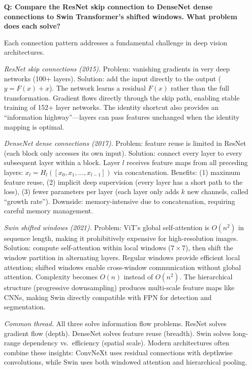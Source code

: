 \begin{interviewq}
\textbf{Q: Compare the ResNet skip connection to DenseNet dense connections to Swin Transformer's shifted windows. What problem does each solve?}

 \quad {} \quad \badgefreq{\freqmed}

\stronganswer Each connection pattern addresses a fundamental challenge in deep vision architectures.

\textit{ResNet skip connections (2015).} Problem: vanishing gradients in very deep networks (100+ layers). Solution: add the input directly to the output ($y = F(x) + x$). The network learns a residual $F(x)$ rather than the full transformation. Gradient flows directly through the skip path, enabling stable training of 152+ layer networks. The identity shortcut also provides an ``information highway''---layers can pass features unchanged when the identity mapping is optimal.

\textit{DenseNet dense connections (2017).} Problem: feature reuse is limited in ResNet (each block only accesses its own input). Solution: connect every layer to every subsequent layer within a block. Layer $l$ receives feature maps from all preceding layers: $x_l = H_l([x_0, x_1, \ldots, x_{l-1}])$ via concatenation. Benefits: (1) maximum feature reuse, (2) implicit deep supervision (every layer has a short path to the loss), (3) fewer parameters per layer (each layer only adds $k$ new channels, called ``growth rate''). Downside: memory-intensive due to concatenation, requiring careful memory management.

\textit{Swin shifted windows (2021).} Problem: ViT's global self-attention is $O(n^2)$ in sequence length, making it prohibitively expensive for high-resolution images. Solution: compute self-attention within local windows ($7 \times 7$), then shift the window partition in alternating layers. Regular windows provide efficient local attention; shifted windows enable cross-window communication without global attention. Complexity becomes $O(n)$ instead of $O(n^2)$. The hierarchical structure (progressive downsampling) produces multi-scale feature maps like CNNs, making Swin directly compatible with FPN for detection and segmentation.

\textit{Common thread.} All three solve information flow problems. ResNet solves gradient flow (depth). DenseNet solves feature reuse (breadth). Swin solves long-range dependency vs.\ efficiency (spatial scale). Modern architectures often combine these insights: ConvNeXt uses residual connections with depthwise convolutions, while Swin uses both windowed attention and hierarchical pooling.


\end{interviewq}
